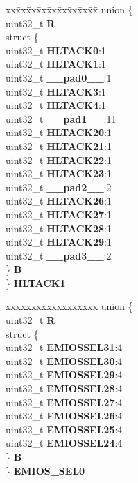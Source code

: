\begin{DoxyCompactItemize}
\begin{tabbing}
\end{tabbing}\item 
\mbox{\label{structSIU__tag_ac089c8268d4fa01ef0453472ace0c86d}} 
\begin{tabbing}
xx\=xx\=xx\=xx\=xx\=xx\=xx\=xx\=xx\=\kill
union \{\\
\>uint32\_t {\bfseries R}\\
\>struct \{\\
\>\>uint32\_t {\bfseries HLTACK0}:1\\
\>\>uint32\_t {\bfseries HLTACK1}:1\\
\>\>uint32\_t {\bfseries \_\_pad0\_\_}:1\\
\>\>uint32\_t {\bfseries HLTACK3}:1\\
\>\>uint32\_t {\bfseries HLTACK4}:1\\
\>\>uint32\_t {\bfseries \_\_pad1\_\_}:11\\
\>\>uint32\_t {\bfseries HLTACK20}:1\\
\>\>uint32\_t {\bfseries HLTACK21}:1\\
\>\>uint32\_t {\bfseries HLTACK22}:1\\
\>\>uint32\_t {\bfseries HLTACK23}:1\\
\>\>uint32\_t {\bfseries \_\_pad2\_\_}:2\\
\>\>uint32\_t {\bfseries HLTACK26}:1\\
\>\>uint32\_t {\bfseries HLTACK27}:1\\
\>\>uint32\_t {\bfseries HLTACK28}:1\\
\>\>uint32\_t {\bfseries HLTACK29}:1\\
\>\>uint32\_t {\bfseries \_\_pad3\_\_}:2\\
\>\} {\bfseries B}\\
\} {\bfseries HLTACK1}\\

\end{tabbing}\item 
\mbox{\label{structSIU__tag_a224fa57ad3a1359d28e03ec07c4fc6cb}} 
\begin{tabbing}
xx\=xx\=xx\=xx\=xx\=xx\=xx\=xx\=xx\=\kill
union \{\\
\>uint32\_t {\bfseries R}\\
\>struct \{\\
\>\>uint32\_t {\bfseries EMIOSSEL31}:4\\
\>\>uint32\_t {\bfseries EMIOSSEL30}:4\\
\>\>uint32\_t {\bfseries EMIOSSEL29}:4\\
\>\>uint32\_t {\bfseries EMIOSSEL28}:4\\
\>\>uint32\_t {\bfseries EMIOSSEL27}:4\\
\>\>uint32\_t {\bfseries EMIOSSEL26}:4\\
\>\>uint32\_t {\bfseries EMIOSSEL25}:4\\
\>\>uint32\_t {\bfseries EMIOSSEL24}:4\\
\>\} {\bfseries B}\\
\} {\bfseries EMIOS\_SEL0}\\


\end{tabbing}
\end{DoxyCompactItemize}

